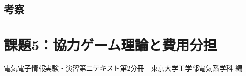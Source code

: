 \documentclass[]{jsarticle}
\begin{document}

  \subsection{考察}


\section{課題5：協力ゲーム理論と費用分担}


  \begin{thebibliography}{9}
     電気電子情報実験・演習第二テキスト第2分冊　東京大学工学部電気系学科 編
  \end{thebibliography}
\end{document}
